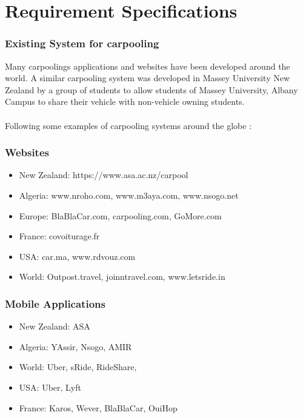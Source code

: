 \chapter{Requirement Specifications} \label{chap:reqs}

\subsection{Existing System for carpooling}
\justify
Many carpoolings applications and websites have been developed around the world. A similar carpooling system was developed in Massey University New Zealand by a group of students to allow students of Massey University, Albany Campus to share their vehicle with non-vehicle owning students.\\~\\
Following some examples of carpooling systems around the globe : 

\subsection{Websites}
\begin{itemize}

\item New Zealand: https://www.asa.ac.nz/carpool
\item Algeria: www.nroho.com, www.m3aya.com, www.nsogo.net
\item Europe: BlaBlaCar.com, carpooling.com, GoMore.com
\item France: covoiturage.fr
\item USA: car.ma, www.rdvouz.com
\item World: Outpost.travel, joinntravel.com, www.letsride.in

\end{itemize}

\subsection{Mobile Applications}
\begin{itemize}

\item New Zealand: ASA
\item Algeria: YAssir, Nsogo, AMIR
\item World: Uber, sRide, RideShare, 
\item USA: Uber, Lyft
\item France: Karos, Wever, BlaBlaCar, OuiHop

\end{itemize}
